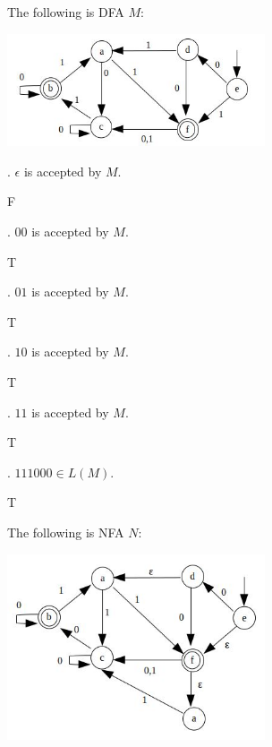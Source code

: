 

\renewcommand\AUTHOR{nweadick1@cougars.ccis.edu} %


\topmattertwo


The following is DFA $M$:
\begin{center}
\includegraphics[width=3in]{Capture0.JPG}
\end{center}

\nextq
\tf. $\epsilon$ is accepted by $M$.
\\
\ANSWER
\begin{answerlong}
F
\end{answerlong}

\nextq
\tf. $00$ is accepted by $M$.
\\
\ANSWER
\begin{answerlong}
T
\end{answerlong}

\nextq
\tf. $01$ is accepted by $M$.
\\
\ANSWER
\begin{answerlong}
T
\end{answerlong}

\nextq
\tf. $10$ is accepted by $M$.
\\
\ANSWER
\begin{answerlong}
T
\end{answerlong}

\nextq
\tf. $11$ is accepted by $M$.
\\
\ANSWER
\begin{answerlong}
T
\end{answerlong}

\nextq
\tf. $111000 \in L(M)$.
\\
\ANSWER
\begin{answerlong}
T
\end{answerlong}

The following is NFA $N$:
\begin{center}
\includegraphics[width=3in]{Capture.JPG}
\end{center}

